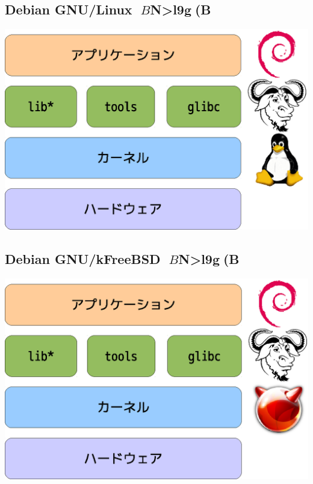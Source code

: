 \documentclass[mingoth,a4paper]{jsarticle}
\begin{document}
{{{{{{{{{{{{{%
%

\subsection{Debian GNU/Linux $B$N>l9g(B}
\includegraphics[width=0.8\hsize]{image201006/os-block02.eps}


\subsection{Debian GNU/kFreeBSD $B$N>l9g(B}
\includegraphics[width=0.8\hsize]{image201006/os-block03.eps}


}}}}}}}}}}}}}
\end{document}
